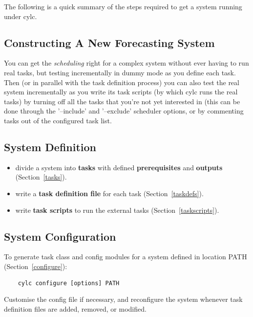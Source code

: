 \documentclass[11pt,a4paper]{article}
\begin{document}
The following is a quick summary of the steps required to get a system
running under cylc. 

\subsection{Constructing A New Forecasting System}

You can get the {\em scheduling} right for a complex system without ever
having to run real tasks, but testing incrementally in dummy mode as you
define each task. Then (or in parallel with the task definition process)
you can also test the real system incrementally as you write its task
scripts (by which cylc runs the real tasks) by turning off all the
tasks that you're not yet interested in (this can be done through the
'--include' and '--exclude' scheduler options, or by commenting tasks
out of the configured task list.

\pagebreak
\subsection{System Definition} 

\begin{itemize}
    \item divide a system into {\bf tasks} with defined {\bf
        prerequisites} and {\bf outputs} (Section~\ref{tasks}).

    \item write a {\bf task definition file} for each task
        (Section~\ref{taskdefs}).

    \item write {\bf task scripts} to run the external tasks
        (Section~\ref{taskscripts}).
\end{itemize}

\subsection{System Configuration}

To generate task class and config modules for a system defined in
location PATH (Section~\ref{configure}): 

\begin{lstlisting}
    cylc configure [options] PATH
\end{lstlisting}

Customise the config file if necessary, and reconfigure the system
whenever task definition files are added, removed, or modified.
\end{document}
